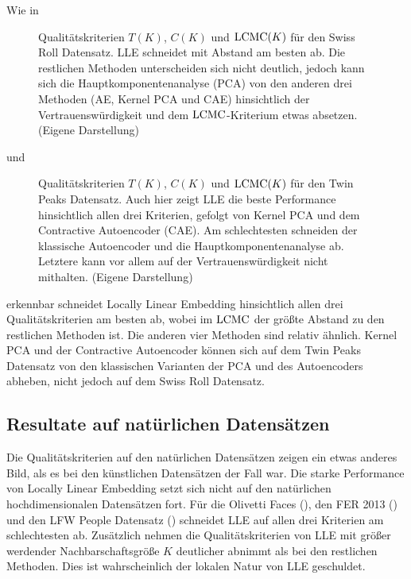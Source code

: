 Wie in 
\begin{figure}[ht]
	\label{fig:SwissRollMetrics}
	\begin{center}
		
	\end{center}
	\caption[Swiss Roll Qualitätskriterien]{Qualitätskriterien $T(K)$,  $C(K)$ und $\operatorname{LCMC}(K)$ für den Swiss Roll Datensatz. LLE schneidet mit Abstand am besten ab. Die restlichen Methoden unterscheiden sich nicht deutlich, jedoch kann sich die Hauptkomponentenanalyse (PCA) von den anderen drei Methoden (AE, Kernel PCA und CAE) hinsichtlich der Vertrauenswürdigkeit und dem $\operatorname{LCMC}$-Kriterium etwas absetzen. (Eigene Darstellung)}
\end{figure}
und 
\begin{figure}[ht]
	\label{fig:TwinPeaksMetrics}
	\begin{center}
		
	\end{center}
	\caption[Twin Peaks Qualitätskriterien]{Qualitätskriterien $T(K)$, $C(K)$ und $\operatorname{LCMC}(K)$ für den Twin Peaks Datensatz. Auch hier zeigt LLE die beste Performance hinsichtlich allen drei Kriterien, gefolgt von Kernel PCA und dem Contractive Autoencoder (CAE). Am schlechtesten schneiden der klassische Autoencoder und die Hauptkomponentenanalyse ab. Letztere kann vor allem auf der Vertrauenswürdigkeit nicht mithalten. (Eigene Darstellung)}
\end{figure}
erkennbar schneidet Locally Linear Embedding hinsichtlich allen drei Qualitätskriterien am besten ab, wobei im $\operatorname{LCMC}$ der größte Abstand zu den restlichen Methoden ist. Die anderen vier Methoden sind relativ ähnlich. Kernel PCA und der Contractive Autoencoder können sich auf dem Twin Peaks Datensatz von den klassischen Varianten der PCA und des Autoencoders abheben, nicht jedoch auf dem Swiss Roll Datensatz.

\subsection{Resultate auf natürlichen Datensätzen}
\label{ch:Vergleich:sec:Resultate:natuerlich}

Die Qualitätskriterien auf den natürlichen Datensätzen zeigen ein etwas anderes Bild, als es bei
den künstlichen Datensätzen der Fall war. Die starke Performance von Locally Linear Embedding setzt
sich nicht auf den natürlichen hochdimensionalen Datensätzen fort. Für die Olivetti Faces
(), den FER 2013 () und den LFW People
Datensatz () schneidet LLE auf allen drei Kriterien am schlechtesten
ab. Zusätzlich nehmen die Qualitätskriterien von LLE mit größer werdender Nachbarschaftsgröße $K$
deutlicher abnimmt als bei den restlichen Methoden. Dies ist wahrscheinlich der lokalen Natur von
LLE geschuldet.

